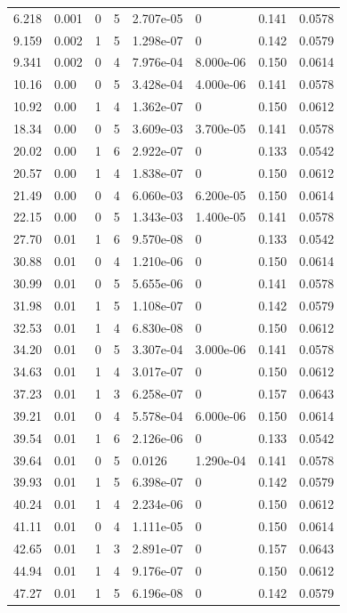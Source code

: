\documentclass[preview]{standalone}
\begin{document}
{{\begin{tabular}{L{1.2cm}C{1.2cm} C{0.3cm}C{0.5cm} C{1.4cm}C{1.4cm} C{1.4cm}C{1.4cm}}
  6.218  &  0.001  & 0     &  5 &  2.707e-05  & 0  & 0.141 &  0.0578   \\ 
  9.159  &  0.002  & 1     &  5 &  1.298e-07  & 0  & 0.142 &  0.0579   \\ 
  9.341  &  0.002  & 0     &  4 &  7.976e-04  & 8.000e-06  & 0.150 &  0.0614   \\ 
  10.16  &  0.00  & 0     &  5 &  3.428e-04  & 4.000e-06  & 0.141 &  0.0578   \\ 
  10.92  &  0.00  & 1     &  4 &  1.362e-07  & 0  & 0.150 &  0.0612   \\ 
  18.34  &  0.00  & 0     &  5 &  3.609e-03  & 3.700e-05  & 0.141 &  0.0578   \\ 
  20.02  &  0.00  & 1     &  6 &  2.922e-07  & 0  & 0.133 &  0.0542   \\ 
  20.57  &  0.00  & 1     &  4 &  1.838e-07  & 0  & 0.150 &  0.0612   \\ 
  21.49  &  0.00  & 0     &  4 &  6.060e-03  & 6.200e-05  & 0.150 &  0.0614   \\ 
  22.15  &  0.00  & 0     &  5 &  1.343e-03  & 1.400e-05  & 0.141 &  0.0578   \\ 
  27.70  &  0.01  & 1     &  6 &  9.570e-08  & 0  & 0.133 &  0.0542   \\ 
  30.88  &  0.01  & 0     &  4 &  1.210e-06  & 0  & 0.150 &  0.0614   \\ 
  30.99  &  0.01  & 0     &  5 &  5.655e-06  & 0  & 0.141 &  0.0578   \\ 
  31.98  &  0.01  & 1     &  5 &  1.108e-07  & 0  & 0.142 &  0.0579   \\ 
  32.53  &  0.01  & 1     &  4 &  6.830e-08  & 0  & 0.150 &  0.0612   \\ 
  34.20  &  0.01  & 0     &  5 &  3.307e-04  & 3.000e-06  & 0.141 &  0.0578   \\ 
  34.63  &  0.01  & 1     &  4 &  3.017e-07  & 0  & 0.150 &  0.0612   \\ 
  37.23  &  0.01  & 1     &  3 &  6.258e-07  & 0  & 0.157 &  0.0643   \\ 
  39.21  &  0.01  & 0     &  4 &  5.578e-04  & 6.000e-06  & 0.150 &  0.0614   \\ 
  39.54  &  0.01  & 1     &  6 &  2.126e-06  & 0  & 0.133 &  0.0542   \\ 
  39.64  &  0.01  & 0     &  5 &  0.0126  & 1.290e-04  & 0.141 &  0.0578   \\ 
  39.93  &  0.01  & 1     &  5 &  6.398e-07  & 0  & 0.142 &  0.0579   \\ 
  40.24  &  0.01  & 1     &  4 &  2.234e-06  & 0  & 0.150 &  0.0612   \\ 
  41.11  &  0.01  & 0     &  4 &  1.111e-05  & 0  & 0.150 &  0.0614   \\ 
  42.65  &  0.01  & 1     &  3 &  2.891e-07  & 0  & 0.157 &  0.0643   \\ 
  44.94  &  0.01  & 1     &  4 &  9.176e-07  & 0  & 0.150 &  0.0612   \\ 
  47.27  &  0.01  & 1     &  5 &  6.196e-08  & 0  & 0.142 &  0.0579   \\ 
\hline 
\end{tabular} 

}}
\end{document}
